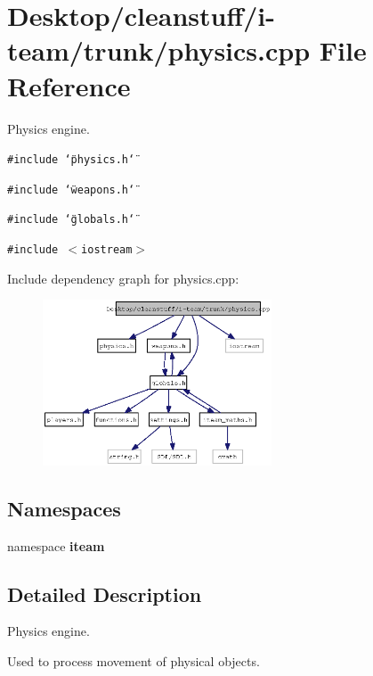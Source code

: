 \section{Desktop/cleanstuff/i-team/trunk/physics.cpp File Reference}
\label{physics_8cpp}
Physics engine. 

{\tt \#include \char`\"{}physics.h\char`\"{}}\par
{\tt \#include \char`\"{}weapons.h\char`\"{}}\par
{\tt \#include \char`\"{}globals.h\char`\"{}}\par
{\tt \#include $<$iostream$>$}\par


Include dependency graph for physics.cpp:\nopagebreak
\begin{figure}[H]
\begin{center}
\leavevmode
\includegraphics[width=193pt]{physics_8cpp__incl}
\end{center}
\end{figure}
\subsection*{Namespaces}
\begin{CompactItemize}
\item 
namespace {\bf iteam}
\end{CompactItemize}


\subsection{Detailed Description}
Physics engine. 

Used to process movement of physical objects. 